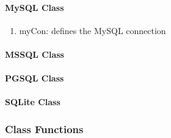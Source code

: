 \documentclass{article}
\begin{document}
\paragraph{MySQL Class}
\begin{enumerate}
\item myCon: defines the MySQL connection
\end{enumerate}
\paragraph{MSSQL Class}
\paragraph{PGSQL Class}
\paragraph{SQLite Class}

\subsubsection{Class Functions}
\end{document}
